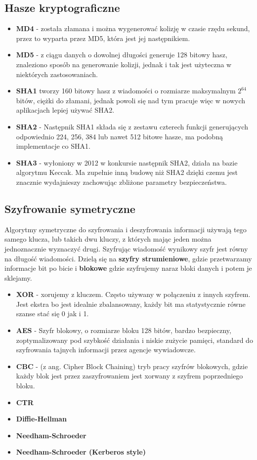 \documentclass[]{article}
\begin{document}
\subsection{Hasze kryptograficzne}
\begin{itemize}
    \item \textbf{MD4} - została złamana i można wygenerować kolizję w czasie rzędu sekund, przez to wyparta przez MD5, która jest jej następnikiem.
    \item \textbf{MD5} - z ciągu danych o dowolnej długości generuje 128 bitowy hasz, znaleziono sposób na generowanie kolizji, jednak i tak jest użyteczna w niektórych zastosowaniach. 
    \item \textbf{SHA1} tworzy 160 bitowy hasz z wiadomości o rozmiarze maksymalnym $2^64$ bitów, ciężki do złamani, jednak powoli się nad tym pracuje więc w nowych aplikacjach lepiej używać SHA2.
    \item \textbf{SHA2} - Następnik SHA1 składa się z zestawu czterech funkcji generujących odpowiednio 224, 256, 384 lub nawet 512 bitowe hasze, ma podobną implementacje co SHA1.
    \item \textbf{SHA3} - wyłoniony w 2012 w konkursie następnik SHA2, działa na bazie algorytmu Keccak. Ma zupełnie inną budowę niż SHA2 dzięki czemu jest znacznie wydajnieszy zachowując zbliżone parametry bezpieczeństwa.
\end{itemize}
\subsection{Szyfrowanie symetryczne}
Algorytmy symetryczne do szyfrowania i deszyfrowania informacji używają tego samego klucza, lub takich dwu kluczy, z których mając jeden można jednoznacznie wyznaczyć drugi. Szyfrując wiadomość wynikowy szyfr jest równy na długość wiadomości. Dzielą się na \textbf{szyfry strumieniowe}, gdzie przetwarzamy informacje bit po bicie i \textbf{blokowe} gdzie szyfrujemy naraz bloki danych i potem je sklejamy.
\
\begin{itemize}
    \item \textbf{XOR} - xorujemy z kluczem. Często używany w połączeniu z innych szyfrem. Jest ekstra bo jest idealnie zbalansowany, każdy bit ma statystycznie równe szanse stać się 0 jak i 1. 
    \item \textbf{AES} - Szyfr blokowy, o rozmiarze bloku 128 bitów, bardzo bezpieczny, zoptymalizowany pod szybkość działania i niskie zużycie pamięci, standard do szyfrowania tajnych informacji przez agencje wywiadowcze.
    \item \textbf{CBC} - (z ang. Cipher Block Chaining) tryb pracy szyfrów blokowych, gdzie każdy blok jest przez zaszyfrowaniem jest xorwany z szyfrem poprzedniego bloku.
    \item \textbf{CTR}
    \item \textbf{Diffie-Hellman}
    \item \textbf{Needham-Schroeder}
    \item \textbf{Needham-Schroeder (Kerberos style)}
\end{itemize}
\end{document}
